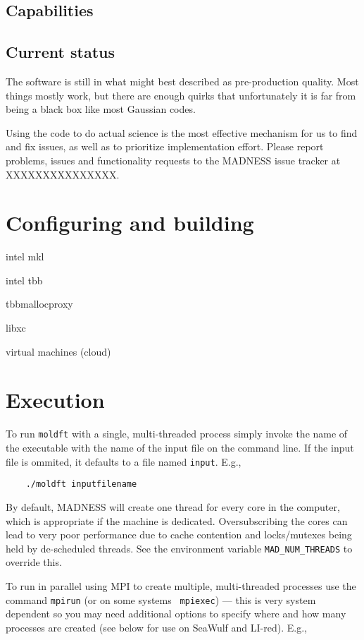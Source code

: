\documentclass[letterpaper]{book}
\begin{document}
\section{Capabilities}



\section{Current status}

The software is still in what might best described as pre-production
quality.  Most things mostly work, but there are enough quirks that
unfortunately it is far from being a black box like most Gaussian
codes.

Using the code to do actual science is the most effective mechanism
for us to find and fix issues, as well as to prioritize implementation
effort.  Please report problems, issues and functionality requests to the
MADNESS issue tracker at XXXXXXXXXXXXXXX.

\chapter{Configuring and building}

intel mkl

intel tbb

tbbmallocproxy

libxc

virtual machines (cloud)

\chapter{Execution}

To run {\tt moldft} with a single, multi-threaded process simply
invoke the name of the executable with the name of the input file on
the command line.  If the input file is ommited, it defaults to a file
named {\tt input}.  E.g.,

\begin{verbatim}
    ./moldft inputfilename
\end{verbatim}

By default, MADNESS will create one thread for every core in the
computer, which is appropriate if the machine is dedicated.
Oversubscribing the cores can lead to very poor performance due to
cache contention and locks/mutexes being held by de-scheduled threads.
See the environment variable \verb+MAD_NUM_THREADS+ to override this.

To run in parallel using MPI to create multiple, multi-threaded
processes use the command {\tt mpirun} (or on some systems {\tt
  mpiexec}) --- this is very system dependent so you may need
additional options to specify where and how many processes are created
(see below for use on SeaWulf and LI-red).  E.g.,
\end{document}
